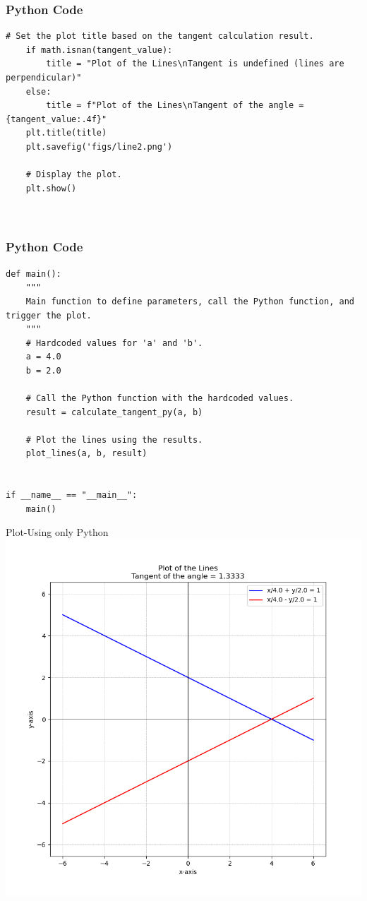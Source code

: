 \documentclass{beamer}
\begin{document}
\begin{frame}[fragile]
    \frametitle{Python Code }
    \begin{lstlisting}
# Set the plot title based on the tangent calculation result.
    if math.isnan(tangent_value):
        title = "Plot of the Lines\nTangent is undefined (lines are perpendicular)"
    else:
        title = f"Plot of the Lines\nTangent of the angle = {tangent_value:.4f}"
    plt.title(title)
    plt.savefig('figs/line2.png')

    # Display the plot.
    plt.show()

    

\end{lstlisting}
\end{frame}

\begin{frame}[fragile]
    \frametitle{Python Code }
    \begin{lstlisting}
def main():
    """
    Main function to define parameters, call the Python function, and trigger the plot.
    """
    # Hardcoded values for 'a' and 'b'.
    a = 4.0
    b = 2.0

    # Call the Python function with the hardcoded values.
    result = calculate_tangent_py(a, b)

    # Plot the lines using the results.
    plot_lines(a, b, result)


if __name__ == "__main__":
    main()

\end{lstlisting}
\end{frame}




\begin{frame}{Plot-Using only Python}
    \centering
    \includegraphics[width=\columnwidth, height=0.8\textheight, keepaspectratio]{figs/line2.png}     
\end{frame}
\end{document}
